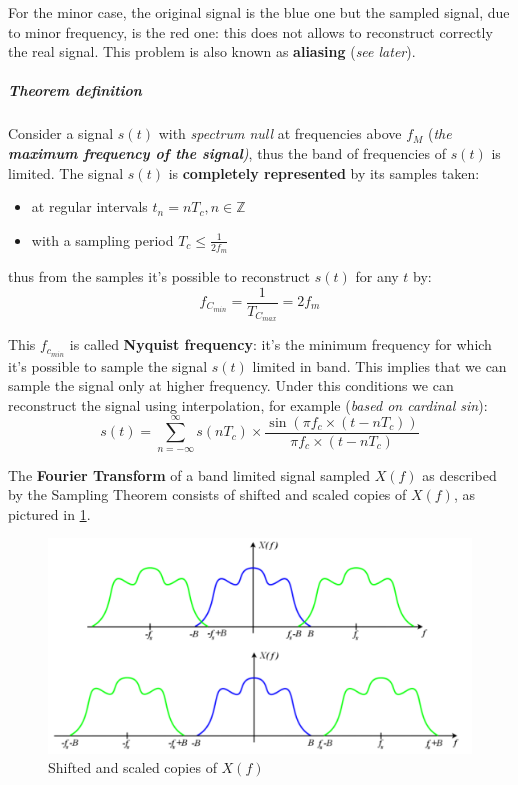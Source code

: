 \documentclass[10pt,a4paper]{report}
\theoremstyle{definition}
\begin{document}
For the minor case, the original signal is the blue one but the sampled signal, due to minor frequency, is the red one: this does not allows to reconstruct correctly the real signal. This problem is also known as \textbf{aliasing} (\textit{see later}).
\subparagraph{Theorem definition}\label{sec:theorem-definition}
Consider a signal $s(t)$ with \textit{spectrum null} at frequencies above $f_{M}$ (\textit{the \textbf{maximum frequency of the signal})}, thus the band of frequencies of $s(t)$ is limited.
The signal $s(t)$ is \textbf{completely represented} by its samples taken:
\begin{itemize}
	\item 
	at regular intervals $t_{n} = nT_{c}, n \in \mathbb{Z}$
	\item 
	with a sampling period $T_{c} \leq \frac{1}{2f_{m}}$

\end{itemize}
	thus from the samples it's possible to reconstruct $s(t)$ for any $t$ by:
	\begin{equation}
		f_{C_{min}} = \frac{1}{T_{C_{max}}} = 2f_{m}
	\end{equation}

This $f_{c_{min}}$ is called \textbf{Nyquist frequency}: it's the minimum frequency for which it's possible to sample the signal $s(t)$ limited in band. This implies that we can sample the signal only at higher frequency. Under this conditions we can reconstruct the signal using interpolation, for example (\textit{based on cardinal sin}):
\begin{equation}
	s(t)=\sum_{n=-\infty}^{\infty} s(nT_{c}) \times \frac{\sin(\pi f_{c} \times (t-nT_{c}))}{\pi f_{c} \times (t-nT_{c})}
\end{equation}



The \textbf{Fourier Transform} of a band limited signal sampled $X(f)$ as described by the Sampling Theorem consists of shifted and scaled copies of $X(f)$, as pictured in \ref{ft-shifting-spectrum}.
\begin{figure}[h!]
	\centering\includegraphics[scale=0.50]{images/Pasted image 20230526114412.png}
	\caption{Shifted and scaled copies of $X(f)$}
	\label{ft-shifting-spectrum}
\end{figure}
\end{document}
